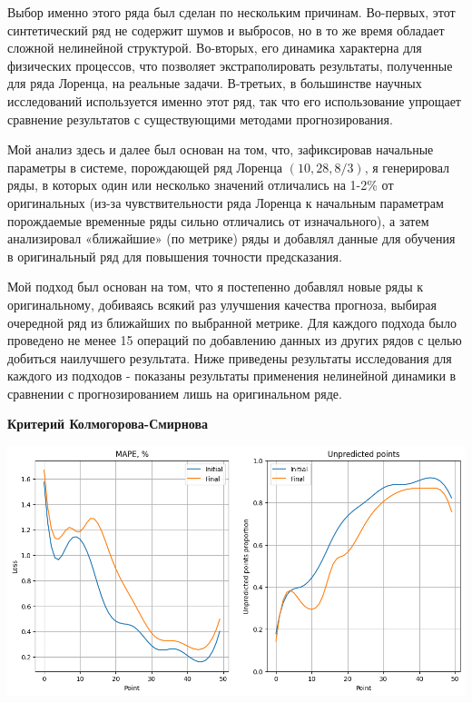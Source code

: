 \documentclass[a4paper, 12pt]{extarticle}
\begin{document}
Выбор именно этого ряда был сделан по нескольким причинам. Во-первых, этот синтетический ряд не содержит шумов и выбросов, но в то же время обладает сложной нелинейной структурой. Во-вторых, его динамика характерна для физических процессов, что позволяет экстраполировать результаты, полученные для ряда Лоренца, на реальные задачи. В-третьих, в большинстве научных исследований используется именно этот ряд, так что его использование упрощает сравнение результатов с существующими методами прогнозирования.

Мой анализ здесь и далее был основан на том, что, зафиксировав начальные параметры в системе, порождающей ряд Лоренца $(10,28,8/3)$, я генерировал ряды, в которых один или несколько значений отличались на 1-2\% от оригинальных (из-за чувствительности ряда Лоренца к начальным параметрам порождаемые временные ряды сильно отличались от изначального), а затем анализировал «ближайшие» (по метрике) ряды и добавлял данные для обучения в оригинальный ряд для повышения точности предсказания.

Мой подход был основан на том, что я постепенно добавлял новые ряды к оригинальному, добиваясь всякий раз улучшения качества прогноза, выбирая очередной ряд из ближайших по выбранной метрике. Для каждого подхода было проведено не менее 15 операций по добавлению данных из других рядов с целью добиться наилучшего результата. Ниже приведены результаты исследования для каждого из подходов - показаны результаты применения нелинейной динамики в сравнении с прогнозированием лишь на оригинальном ряде.

\begin{center}
    \textbf{Критерий Колмогорова-Смирнова}
\end{center}

\begin{center}
    \includegraphics[width=\textwidth]{img/colmogorov.png}
\end{center}
\end{document}
